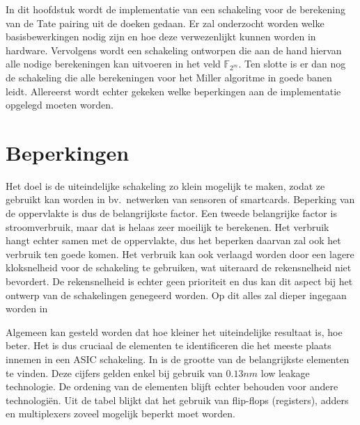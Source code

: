 \label{hfdst-implementatie}

In dit hoofdstuk wordt de implementatie van een schakeling voor de berekening van de Tate pairing uit de doeken gedaan. Er zal onderzocht worden welke basisbewerkingen nodig zijn en hoe deze verwezenlijkt kunnen worden in hardware. Vervolgens wordt een schakeling ontworpen die aan de hand hiervan alle nodige berekeningen kan uitvoeren in het veld $\mathbb{F}_{2^m}$. Ten slotte is er dan nog de schakeling die alle berekeningen voor het Miller algoritme in goede banen leidt. Allereerst wordt echter gekeken welke beperkingen aan de implementatie opgelegd moeten worden.

\section{Beperkingen}\label{sectie-implementatie-beperkingen}

Het doel is de uiteindelijke schakeling zo klein mogelijk te maken, zodat ze gebruikt kan worden in bv.\ netwerken van sensoren of smartcards. Beperking van de oppervlakte is dus de belangrijkste factor. Een tweede belangrijke factor is stroomverbruik, maar dat is helaas zeer moeilijk te berekenen. Het verbruik hangt echter samen met de oppervlakte, dus het beperken daarvan zal ook het verbruik ten goede komen. Het verbruik kan ook verlaagd worden door een lagere kloksnelheid voor de schakeling te gebruiken, wat uiteraard de rekensnelheid niet bevordert. De rekensnelheid is echter geen prioriteit en dus kan dit aspect bij het ontwerp van de schakelingen genegeerd worden. Op dit alles zal dieper ingegaan worden in 

Algemeen kan gesteld worden dat hoe kleiner het uiteindelijke resultaat is, hoe beter. Het is dus cruciaal de elementen te identificeren die het meeste plaats innemen in een ASIC schakeling. In  is de grootte van de belangrijkste elementen te vinden. Deze cijfers gelden enkel bij gebruik van $0.13 nm$ low leakage technologie. De ordening van de elementen blijft echter behouden voor andere technologi\"en. Uit de tabel blijkt dat het gebruik van flip-flops (registers), adders en multiplexers zoveel mogelijk beperkt moet worden.

